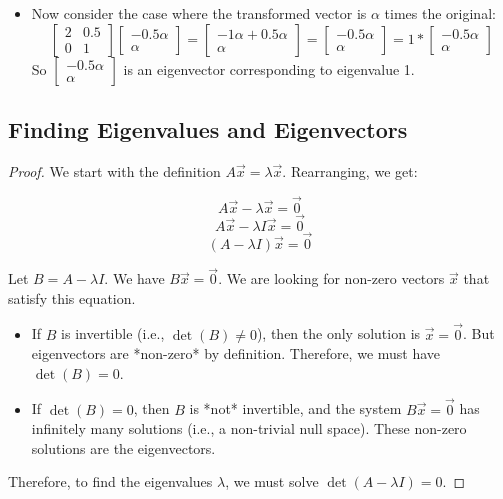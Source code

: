 \documentclass{report}
\begin{document}
{\begin{itemize}
		\item Now consider the case where the transformed vector is $\alpha$ times the original:
		      \[\begin{bmatrix} 2 & 0.5 \\ 0 & 1 \end{bmatrix} \begin{bmatrix} -0.5\alpha \\ \alpha \end{bmatrix} =
			      \begin{bmatrix} -1\alpha + 0.5\alpha \\ \alpha \end{bmatrix} =
			      \begin{bmatrix} -0.5\alpha \\ \alpha \end{bmatrix} = 1 * \begin{bmatrix} -0.5\alpha \\ \alpha \end{bmatrix}\]
		      So $\begin{bmatrix} -0.5\alpha \\ \alpha \end{bmatrix}$ is an eigenvector corresponding to eigenvalue 1.

	\end{itemize}
}

\subsection{Finding Eigenvalues and Eigenvectors}

\begin{proof}
	We start with the definition $A\vec{x} = \lambda\vec{x}$.  Rearranging, we get:

	\[A\vec{x} - \lambda\vec{x} = \vec{0}\]
	\[A\vec{x} - \lambda I\vec{x} = \vec{0}\]
	\[(A - \lambda I)\vec{x} = \vec{0}\]

	Let $B = A - \lambda I$.  We have $B\vec{x} = \vec{0}$.  We are looking for non-zero vectors $\vec{x}$ that satisfy this equation.

	\begin{itemize}
		\item If $B$ is invertible (i.e., $\det(B) \neq 0$), then the only solution is $\vec{x} = \vec{0}$.  But eigenvectors are *non-zero* by definition.  Therefore, we must have $\det(B) = 0$.
		\item If $\det(B) = 0$, then $B$ is *not* invertible, and the system $B\vec{x} = \vec{0}$ has infinitely many solutions (i.e., a non-trivial null space). These non-zero solutions are the eigenvectors.
	\end{itemize}

	Therefore, to find the eigenvalues $\lambda$, we must solve $\det(A - \lambda I) = 0$.
\end{proof}
\end{document}
